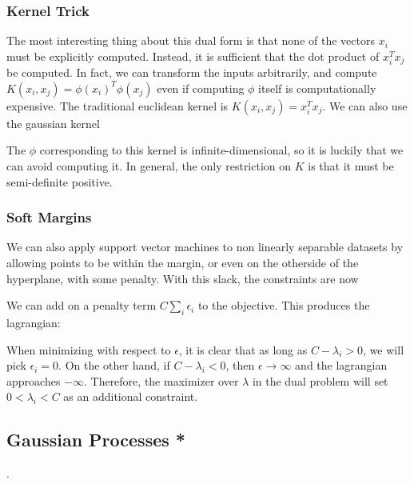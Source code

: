 \documentclass[12pt]{article}
\begin{document}
\subsubsection{Kernel Trick}

The most interesting thing about this dual form is that none of the vectors $x_i$ must be explicitly computed. Instead, it is sufficient that the dot product of $x_i^T x_j$ be computed. In fact, we can transform the inputs arbitrarily, and compute $K(x_i, x_j) = \phi(x_i)^T \phi(x_j)$ even if computing $\phi$ itself is computationally expensive. The traditional euclidean kernel is $K(x_i, x_j) = x_i^Tx_j$. We can also use the gaussian kernel


The $\phi$ corresponding to this kernel is infinite-dimensional, so it is luckily that we can avoid computing it. In general, the only restriction on $K$ is that it must be semi-definite positive.

\subsubsection{Soft Margins}

We can also apply support vector machines to non linearly separable datasets by allowing points to be within the margin, or even on the otherside of the hyperplane, with some penalty. With this slack, the constraints are now


We can add on a penalty term $C\sum_i \epsilon_i$ to the objective. This produces the lagrangian:


When minimizing with respect to $\epsilon$, it is clear that as long as $C-\lambda_i > 0$, we will pick $\epsilon_i = 0$. On the other hand, if $C -\lambda_i < 0$, then $\epsilon \rightarrow \infty$ and the lagrangian approaches $- \infty$. Therefore, the maximizer over $\lambda$ in the dual problem will set $0 < \lambda_i < C$ as an additional constraint.

\subsection{Gaussian Processes *}
.
\end{document}
